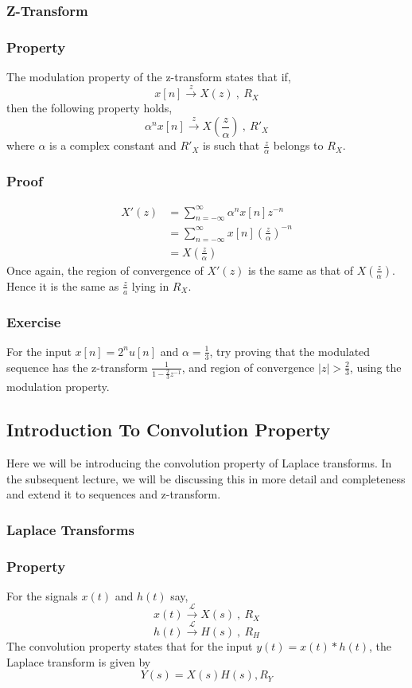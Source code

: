 \subsubsection{Z-Transform}
\subsubsection{Property}
The modulation property of the z-transform states that if,
\[
x[n] \xrightarrow{\ z\ } X(z)\ ,\ R_{X}
\]
then the following property holds,
\[
{\alpha}^nx[n] \xrightarrow{\ z\ } X(\frac{z}{\alpha})\ ,\ {R'}_{X} 
\]
where $\alpha$ is a complex constant and ${R'}_X$ is such that $\frac{z}{\alpha}$ belongs to $R_X$.

\subsubsection{Proof}
\begin{align*}
X'(z) &= \sum_{n=-\infty}^{\infty}{\alpha^n x[n]z^{-n}}\\
& = \sum_{n=-\infty}^{\infty}{x[n]{(\frac{z}{\alpha})}^{-n}}\\
&= X(\frac{z}{\alpha})
\end{align*}
Once again, the region of convergence of $X'(z)$ is the same as that of $X(\frac{z}{\alpha})$. Hence it is the same as $\frac{z}{a}$ lying in $R_X$.
\subsubsection{Exercise}
For the input $x[n] = 2^nu[n]$ and $\alpha = \frac{1}{3}$, try proving that the modulated sequence has the z-transform $\frac{1}{1 - \frac{2}{3}z^{-1}}$, and region of convergence $|z| > \frac{2}{3}$, using the modulation property.

\subsection{Introduction To Convolution Property}
Here we will be introducing the convolution property of Laplace transforms. In the subsequent lecture, we will be discussing this in more detail and completeness and extend it to sequences and z-transform. \\

\subsubsection{Laplace Transforms}
\subsubsection{Property}
For the signals $x(t)$ and $h(t)$ say,
\[
x(t) \xrightarrow{\ \mathcal{L}\ } X(s)\ ,\ R_X
\]\[
h(t) \xrightarrow{\ \mathcal{L}\ } H(s)\ ,\ R_H
\]
The convolution property states that for the input $y(t) = x(t) \ast h(t)$, the Laplace transform is given by
\[
	Y(s) = X(s)H(s)  , R_Y
\]

